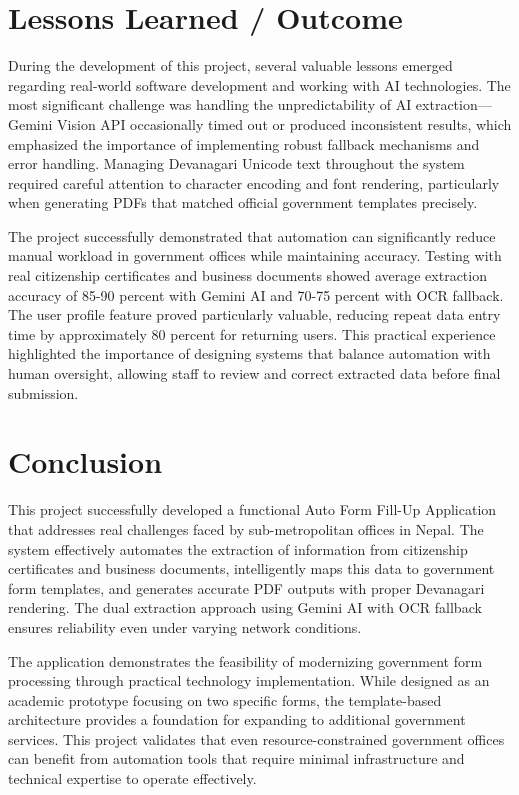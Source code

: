 \documentclass[12pt]{report}
\begin{document}
\section{Lessons Learned / Outcome}
During the development of this project, several valuable lessons emerged regarding real-world software development and working with AI technologies. The most significant challenge was handling the unpredictability of AI extraction—Gemini Vision API occasionally timed out or produced inconsistent results, which emphasized the importance of implementing robust fallback mechanisms and error handling. Managing Devanagari Unicode text throughout the system required careful attention to character encoding and font rendering, particularly when generating PDFs that matched official government templates precisely.

The project successfully demonstrated that automation can significantly reduce manual workload in government offices while maintaining accuracy. Testing with real citizenship certificates and business documents showed average extraction accuracy of 85-90 percent with Gemini AI and 70-75 percent with OCR fallback. The user profile feature proved particularly valuable, reducing repeat data entry time by approximately 80 percent for returning users. This practical experience highlighted the importance of designing systems that balance automation with human oversight, allowing staff to review and correct extracted data before final submission.


\section{Conclusion}
This project successfully developed a functional Auto Form Fill-Up Application that addresses real challenges faced by sub-metropolitan offices in Nepal. The system effectively automates the extraction of information from citizenship certificates and business documents, intelligently maps this data to government form templates, and generates accurate PDF outputs with proper Devanagari rendering. The dual extraction approach using Gemini AI with OCR fallback ensures reliability even under 
varying network conditions.

The application demonstrates the feasibility of modernizing government form processing through practical technology implementation. While designed as an academic prototype focusing on two specific forms, the template-based architecture provides a foundation for expanding to additional government services. This project validates that even resource-constrained government offices can benefit from automation tools that require minimal infrastructure and technical expertise to operate effectively.
\end{document}
